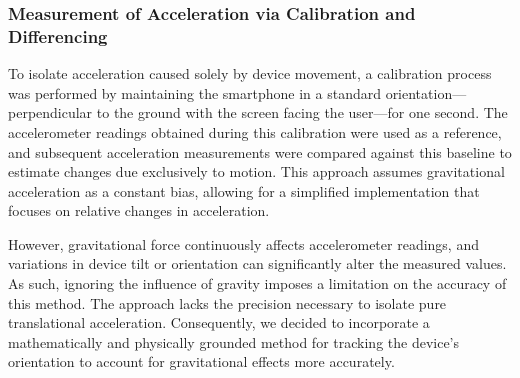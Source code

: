 \documentclass{article}
\begin{document}
\subsubsection{Measurement of Acceleration via Calibration and Differencing}

To isolate acceleration caused solely by device movement, a calibration process was performed by maintaining the smartphone in a standard orientation—perpendicular to the ground with the screen facing the user—for one second. The accelerometer readings obtained during this calibration were used as a reference, and subsequent acceleration measurements were compared against this baseline to estimate changes due exclusively to motion. This approach assumes gravitational acceleration as a constant bias, allowing for a simplified implementation that focuses on relative changes in acceleration.

However, gravitational force continuously affects accelerometer readings, and variations in device tilt or orientation can significantly alter the measured values. As such, ignoring the influence of gravity imposes a limitation on the accuracy of this method. The approach lacks the precision necessary to isolate pure translational acceleration. Consequently, we decided to incorporate a mathematically and physically grounded method for tracking the device’s orientation to account for gravitational effects more accurately.
\end{document}
